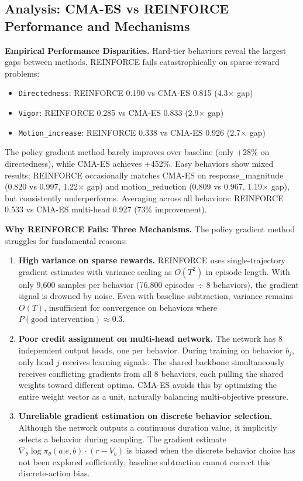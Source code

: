 \documentclass{article}
\begin{document}
\subsection{Analysis: CMA-ES vs REINFORCE Performance and Mechanisms}

\textbf{Empirical Performance Disparities.} Hard-tier behaviors reveal the largest gaps between methods. REINFORCE fails catastrophically on sparse-reward problems:
\begin{itemize}
  \item \texttt{Directedness}: REINFORCE 0.190 vs CMA-ES 0.815 (4.3$\times$ gap)
  \item \texttt{Vigor}: REINFORCE 0.285 vs CMA-ES 0.833 (2.9$\times$ gap)
  \item \texttt{Motion\_increase}: REINFORCE 0.338 vs CMA-ES 0.926 (2.7$\times$ gap)
\end{itemize}
The policy gradient method barely improves over baseline (only +28\% on directedness), while CMA-ES achieves +452\%. Easy behaviors show mixed results; REINFORCE occasionally matches CMA-ES on response\_magnitude (0.820 vs 0.997, 1.22$\times$ gap) and motion\_reduction (0.809 vs 0.967, 1.19$\times$ gap), but consistently underperforms. Averaging across all behaviors: REINFORCE 0.533 vs CMA-ES multi-head 0.927 (73\% improvement).

\textbf{Why REINFORCE Fails: Three Mechanisms.} The policy gradient method struggles for fundamental reasons:

\begin{enumerate}
  \item \textbf{High variance on sparse rewards.} REINFORCE uses single-trajectory gradient estimates with variance scaling as $O(T^2)$ in episode length. With only 9,600 samples per behavior (76,800 episodes $\div$ 8 behaviors), the gradient signal is drowned by noise. Even with baseline subtraction, variance remains $O(T)$, insufficient for convergence on behaviors where $P(\text{good intervention}) \approx 0.3$.

  \item \textbf{Poor credit assignment on multi-head network.} The network has 8 independent output heads, one per behavior. During training on behavior $b_j$, only head $j$ receives learning signals. The shared backbone simultaneously receives conflicting gradients from all 8 behaviors, each pulling the shared weights toward different optima. CMA-ES avoids this by optimizing the entire weight vector as a unit, naturally balancing multi-objective pressure.

  \item \textbf{Unreliable gradient estimation on discrete behavior selection.} Although the network outputs a continuous duration value, it implicitly selects a behavior during sampling. The gradient estimate $\nabla_\theta \log \pi_\theta(a|e,b) \cdot (r - V_b)$ is biased when the discrete behavior choice has not been explored sufficiently; baseline subtraction cannot correct this discrete-action bias.
\end{enumerate}
\end{document}
